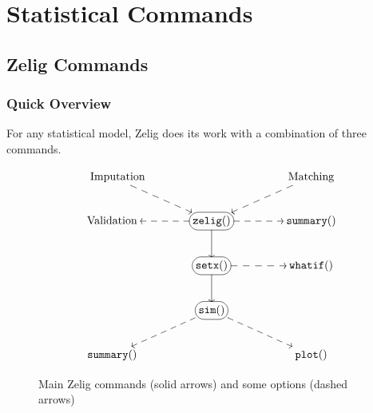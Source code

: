 \chapter{Statistical Commands}

\section{Zelig Commands}\label{s:commands}
  
\subsection{Quick Overview}\label{overview}
  
For any statistical model, Zelig does its work with a combination of
three commands.  
\begin{figure}[h!]
\caption{Main Zelig commands (solid arrows) and some options (dashed arrows)}
\label{3steps}
\begin{center}
\begin{displaymath}
\SelectTips{eu}{12} \UseTips 
\xymatrix@!C{\quad {\rm Imputation}
\ar@{-->}[dr] & & {\rm Matching} \ar@{-->}[dl] \\ 
{\rm Validation } \ar@{<--}[r] & *+[F-:<10pt>]{{\tt zelig()}} \ar@{->}[d] \ar@{-->}[r] &
{\tt summary()}\\ 
 & *+[F-:<10pt>]{{\tt setx()}}  \ar@{-->}[r] \ar@{->}[d] & {\tt whatif()}\\ 
& *+[F-:<10pt>]{{\tt sim()}} \ar@{-->}[dr] \ar@{-->}[dl] & \\
{\tt summary()} & &{\tt plot()} } 
\end{displaymath}
\end{center}
\end{figure}

